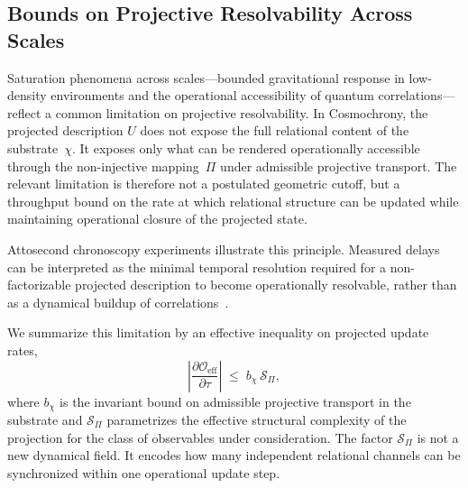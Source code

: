 \subsection{Bounds on Projective Resolvability Across Scales}
  \label{subsec:projective-resolvability-bound}

  Saturation phenomena across scales---bounded gravitational response in low-density
  environments and the operational accessibility of quantum correlations---reflect a
  common limitation on projective resolvability.
  In Cosmochrony, the projected description $U$ does not expose the full relational
  content of the substrate~$\chi$.
  It exposes only what can be rendered operationally accessible through the
  non-injective mapping~$\Pi$ under admissible projective transport.
  The relevant limitation is therefore not a postulated geometric cutoff, but a
  throughput bound on the rate at which relational structure can be updated while
  maintaining operational closure of the projected state.

  Attosecond chronoscopy experiments illustrate this principle.
  Measured delays can be interpreted as the minimal temporal resolution required for a
  non-factorizable projected description to become operationally resolvable, rather than
  as a dynamical buildup of correlations~\cite{PhysRevLett.133.163201}.

  We summarize this limitation by an effective inequality on projected update rates,
  \begin{equation}
    \left| \frac{\partial \mathcal{O}_{\mathrm{eff}}}{\partial \tau} \right|
    \;\leq\;
    b_{\chi}\,\mathcal{S}_{\Pi},
    \label{eq:resolvability_bound}
  \end{equation}
  where $b_{\chi}$ is the invariant bound on admissible projective transport in the
  substrate and $\mathcal{S}_{\Pi}$ parametrizes the effective structural complexity of
  the projection for the class of observables under consideration.
  The factor $\mathcal{S}_{\Pi}$ is not a new dynamical field.
  It encodes how many independent relational channels can be synchronized within one
  operational update step.

